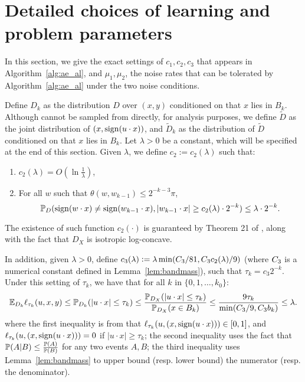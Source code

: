 \section{Detailed choices of learning and problem parameters}
\label{sec:params}

In this section, we give the exact settings of $c_1, c_2, c_3$ that appears in Algorithm~\ref{alg:ae_al}, and $\mu_1, \mu_2$, the noise rates
that can be tolerated by Algorithm~\ref{alg:ae_al} under the two noise conditions.

Define $D_k$ as
the distribution $D$ over $(x,y)$ conditioned on that $x$ lies in $B_k$.
Although cannot be sampled from directly, for analysis purposes, we define $\tilde{D}$ as the joint distribution of $(x, \sign(u \cdot x))$, and
$\tilde{D}_k$ as the distribution of $\tilde{D}$ conditioned on that $x$ lies in $B_k$.
Let $\lambda > 0$ be a constant, which will be specified at the end of this section.
Given $\lambda$, we define $c_2:=c_2(\lambda)$ such that:
\begin{enumerate}
\item $c_2(\lambda) = O(\ln \frac{1}{\lambda})$,
\item For all $w$ such that $\theta(w,w_{k-1}) \leq 2^{-k-3} \pi$,
\begin{equation}
  \P_D( \sign(w \cdot x) \neq \sign(w_{k-1} \cdot x), |w_{k-1} \cdot x| \geq c_2(\lambda) \cdot 2^{-k} ) \leq \lambda \cdot 2^{-k}.
\label{eqn:margin}
\end{equation}
\end{enumerate}
The existence of such function $c_2(\cdot)$ is guaranteed by Theorem 21 of \cite{BL13}, along with the fact that $D_X$ is isotropic log-concave.

In addition, given $\lambda > 0$, define $c_3(\lambda) := \lambda \min(\cf /81, \cf  c_2(\lambda)/9)$ (where $\cf $ is a numerical constant defined in Lemma~\ref{lem:bandmass}), such that $\tau_k = c_3 2^{-k}$. Under this setting of $\tau_k$, we have that for all $k$ in $\{0,1,\ldots,k_0\}$:
\begin{equation}
\E_{D_k} \ell_{\tau_k}(u, x, y) \leq \P_{D_k}(|u \cdot x| \leq \tau_k) \leq \frac{\P_{D_X}(| u \cdot x | \leq \tau_k)}{\P_{D_X}( x \in B_k )} \leq \frac{9 \tau_k}{\min(\cf /9, \cf  b_k)} \leq \lambda.
\label{eqn:lowerr}
\end{equation}
where the first inequality is from that $\ell_{\tau_k}(u, (x, \sign(u \cdot x))) \in [0,1]$, and $\ell_{\tau_k}(u, (x, \sign(u \cdot x))) = 0$ if $|u \cdot x| \geq \tau_k$;
the second inequality uses the fact that $\P(A|B) \leq \frac{\P(A)}{\P(B)}$ for any two events $A,B$; the third inequality uses Lemma~\ref{lem:bandmass} to upper bound (resp. lower bound) the numerator (resp. the denominator).


